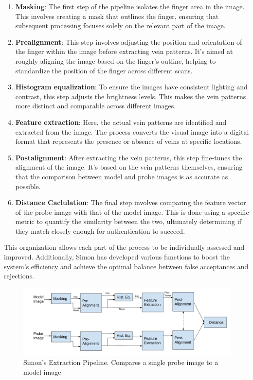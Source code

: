 \begin{enumerate}
    \item \textbf{Masking}: The first step of the pipeline isolates the finger area in the image. This involves creating a mask that outlines the finger, ensuring that subsequent processing focuses solely on the relevant part of the image.

    \item \textbf{Prealignment}: This step involves adjusting the position and orientation of the finger within the image before extracting vein patterns. It's aimed at roughly aligning the image based on the finger's outline, helping to standardize the position of the finger across different scans.

    \item \textbf{Histogram equalization}: To ensure the images have consistent lighting and contrast, this step adjusts the brightness levels. This makes the vein patterns more distinct and comparable across different images.

    \item \textbf{Feature extraction}: Here, the actual vein patterns are identified and extracted from the image. The process converts the visual image into a digital format that represents the presence or absence of veins at specific locations.

    \item \textbf{Postalignment}: After extracting the vein patterns, this step fine-tunes the alignment of the image. It's based on the vein patterns themselves, ensuring that the comparison between model and probe images is as accurate as possible.

    \item \textbf{Distance Caclulation}: The final step involves comparing the feature vector of the probe image with that of the model image. This is done using a specific metric to quantify the similarity between the two, ultimately determining if they match closely enough for authentication to succeed.
\end{enumerate}

This organization allows each part of the process to be individually assessed and improved. Additionally, Simon has developed various functions to boost the system's efficiency and achieve the optimal balance between false acceptances and rejections. 

\begin{figure}[!h]
    \centering
    \includegraphics[width=1\linewidth]{latex-img/pipeline_simon.png}
    \caption{Simon's Extraction Pipeline. Compares a single probe image to a model image}
    \label{pipeline_simon}
\end{figure}


